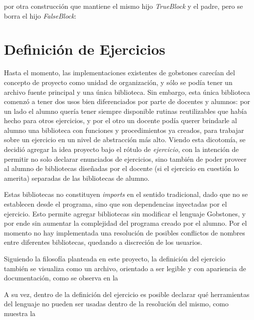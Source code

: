 \centertree{
  [IfElseStatement
    [TrueBlock]
    [FalseBlock]
  ]
} por otra construcción que mantiene el mismo hijo \textit{TrueBlock} y el padre, pero se borra el hijo \textit{FalseBlock}:

\centertree{
  [IfElseStatement
    [TrueBlock]
    [empty]
  ]
}

\bigskip

\section{Definición de Ejercicios}\label{proyecto}

Hasta el momento, las implementaciones existentes de gobstones carecían del concepto de proyecto como unidad de organización, y sólo se podía tener un archivo fuente principal y una única biblioteca. Sin embargo, esta única biblioteca comenzó a tener dos usos bien diferenciados por parte de docentes y alumnos: por un lado el alumno quería tener siempre disponible rutinas reutilizables que había hecho para otros ejercicios, y por el otro un docente podía querer brindarle al alumno una biblioteca con funciones y procedimientos ya creados, para trabajar sobre un ejercicio en un nivel de abstracción más alto.
Viendo esta dicotomía, se decidió agregar la idea proyecto bajo el rótulo de \emph{ejercicio}, con la intención de permitir no solo declarar enunciados de ejercicios, sino también de poder proveer al alumno de bibliotecas diseñadas por el docente (si el ejercicio en cuestión lo amerita) separadas de las bibliotecas de alumno.

Estas bibliotecas no constituyen \textit{imports} en el sentido tradicional, dado que no se establecen desde el programa, sino que son dependencias inyectadas por el ejercicio. Esto permite agregar bibliotecas sin modificar el lenguaje Gobstones, y por ende sin aumentar la complejidad del programa creado por el alumno. Por el momento no hay implementada una resolución de posibles conflictos de nombres entre diferentes bibliotecas, quedando a discreción de los usuarios.

Siguiendo la filosofía planteada en este proyecto, la definición del ejercicio también se visualiza como un archivo, orientado a ser legible y con apariencia de documentación, como se observa en la 


A su vez, dentro de la definición del ejercicio es posible declarar qué herramientas del lenguaje no pueden ser usadas dentro de la resolución del mismo, como muestra la 

